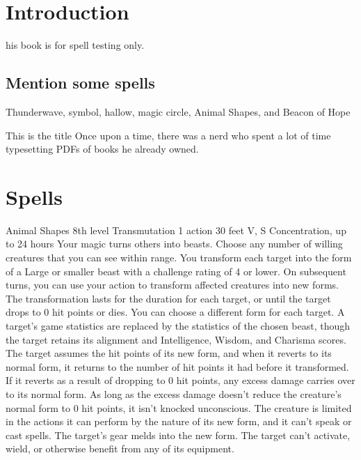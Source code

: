\documentclass[10pt,a4paper,twoside,bg=print,twocolumn,openany,nodeprecatedcode]{dndbook}
\begin{document}
\chapter{Introduction}
his book is for spell testing only.

\section{Mention some spells}
Thunderwave, symbol, hallow, magic circle, Animal Shapes, and Beacon of Hope

\begin{DndSidebar}{This is the title}
    Once upon a time, there was a nerd who spent a lot of time typesetting PDFs of books he already owned.
\end{DndSidebar}


\chapter{Spells}


\DndSpellHeader%
{Animal Shapes}
{8th level Transmutation}
{1 action}
{30 feet}
{V, S}
{Concentration, up to 24 hours}
Your magic turns others into beasts. Choose any number of willing creatures that you can see within range. You transform each target into the form of a Large or smaller beast with a challenge rating of 4 or lower. On subsequent turns, you can use your action to transform affected creatures into new forms.
The transformation lasts for the duration for each target, or until the target drops to 0 hit points or dies. You can choose a different form for each target. A target's game statistics are replaced by the statistics of the chosen beast, though the target retains its alignment and Intelligence, Wisdom, and Charisma scores. The target assumes the hit points of its new form, and when it reverts to its normal form, it returns to the number of hit points it had before it transformed. If it reverts as a result of dropping to 0 hit points, any excess damage carries over to its normal form. As long as the excess damage doesn't reduce the creature's normal form to 0 hit points, it isn't knocked unconscious. The creature is limited in the actions it can perform by the nature of its new form, and it can't speak or cast spells.
The target's gear melds into the new form. The target can't activate, wield, or otherwise benefit from any of its equipment.
\end{document}
